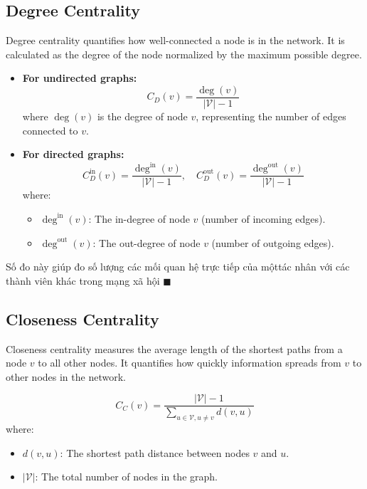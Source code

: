 \documentclass[12pt, a4paper,oneside]{book}
\newenvironment{luuy}{\fontfamily{bch}\HandPencilLeft \selectfont{\textbf{ Note.}} \normalfont}{ \hfill \ensuremath{\blacksquare}}
\begin{document}
\subsection{Degree Centrality}
Degree centrality quantifies how well-connected a node is in the network. It is calculated as the degree of the node normalized by the maximum possible degree.

\begin{itemize}
    \item \textbf{For undirected graphs:}
    \[
    C_D(v) = \frac{\deg(v)}{|\mathcal{V}| - 1}
    \]
    where \( \deg(v) \) is the degree of node \( v \), representing the number of edges connected to \( v \).

    \item \textbf{For directed graphs:}
    \[
    C_D^{\text{in}}(v) = \frac{\deg^{\text{in}}(v)}{|\mathcal{V}| - 1}, \quad C_D^{\text{out}}(v) = \frac{\deg^{\text{out}}(v)}{|\mathcal{V}| - 1}
    \]
    where:
    \begin{itemize}
        \item \( \deg^{\text{in}}(v) \): The in-degree of node \( v \) (number of incoming edges).
        \item \( \deg^{\text{out}}(v) \): The out-degree of node \( v \) (number of outgoing edges).
    \end{itemize}
\end{itemize}
\begin{luuy}
    Số đo này giúp đo số lượng các mối quan hệ trực tiếp của mộttác nhân với các thành viên khác trong mạng xã hội
\end{luuy}

\subsection{Closeness Centrality}
Closeness centrality measures the average length of the shortest paths from a node \( v \) to all other nodes. It quantifies how quickly information spreads from \( v \) to other nodes in the network.

\[
C_C(v) = \frac{|\mathcal{V}| - 1}{\sum_{u \in\mathcal{V}, u \neq v} d(v, u)}
\]
where:
\begin{itemize}
    \item \( d(v, u) \): The shortest path distance between nodes \( v \) and \( u \).
    \item \( |\mathcal{V}| \): The total number of nodes in the graph.
\end{itemize}
\end{document}
